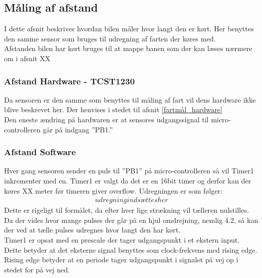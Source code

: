 


\subsection{Måling af afstand}
\label{afstandmål}
I dette afsnit beskrives hvordan bilen måler hvor langt den er kørt. Her benyttes den samme sensor som bruges til udregning af farten der køres med. \\
Afstanden bilen har kørt bruges til at mappe banen som der kan læses nærmere om i afsnit XX 

\subsubsection{Afstand Hardware - TCST1230}
\label{afstandmål_hardware}
Da sensoren er den samme som benyttes til måling af fart vil dens hardware ikke blive beskrevet her. Der henvises i stedet til afsnit \ref{fartmål_hardware} \\
Den eneste ændring på hardwaren er at sensores udgangssignal til micro-controlleren går på indgang ”PB1.”

\subsubsection{Afstand Software}
\label{afstandmål_software}
Hver gang sensoren sender en puls til ”PB1” på micro-controlleren så vil Timer1 inkrementer med en. Timer1 er valgt da det er en 16bit timer og derfor kan der køres XX meter før timeren giver overflow. Udregningen er som følger: 
\begin{align*}
udregning indsættes her
\end{align*}
Dette er rigeligt til formålet, da efter hver lige strækning vil tælleren nulstilles.   \\

Da der vides hvor mange pulses der går på en hjul omdrejning, nemlig 4.2, så kan der ved at tælle pulses udregnes hvor langt den har kørt.  \\

Timer1 er opsat med en prescale der tager udgangspunkt i et ekstern input. Dette betyder at det eksterne signal benyttes som clock-frekvens med rising edge. Rising edge betyder at en periode tager udgangspunkt i signalet på vej op i stedet for på vej ned. 




